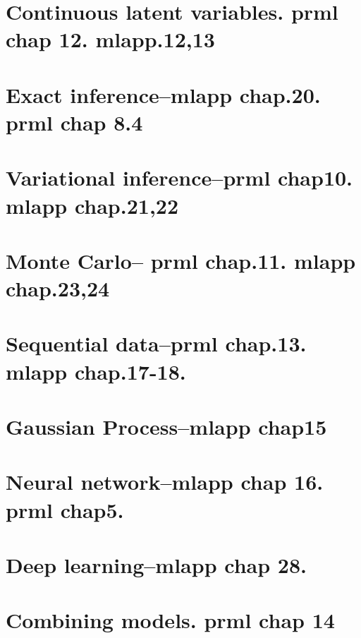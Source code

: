 \documentclass{article}
\begin{document}
\section{Continuous latent variables. prml chap 12. mlapp.12,13}

\section{Exact inference--mlapp chap.20. prml chap 8.4}

\section{Variational inference--prml chap10. mlapp chap.21,22}

\section{Monte Carlo-- prml chap.11. mlapp chap.23,24}

\section{Sequential data--prml chap.13. mlapp chap.17-18.}

\section{Gaussian Process--mlapp chap15}

\section{Neural network--mlapp chap 16. prml chap5.}

\section{Deep learning--mlapp chap 28.}

\section{Combining models. prml chap 14}
\end{document}
